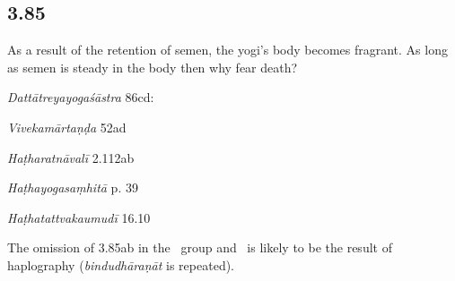 \begin{ekdosis}
\subsection*{3.85}
\begin{translation}[hp03_085]
As a result of the retention of semen, the yogi's body becomes fragrant. As long as semen is steady in the body then why fear death?%
\end{translation}

\begin{sources}[hp03_085]
\emph{Dattātreyayogaśāstra} 86cd:
\begin{versinnote}
\end{versinnote}

\emph{Vivekamārtaṇḍa} 52ad
\begin{versinnote}
\end{versinnote}
\end{sources}

\begin{testimonia}[hp03_085]
\emph{Haṭharatnāvalī} 2.112ab
\begin{versinnote}
\end{versinnote}

\emph{Haṭhayogasaṃhitā} p. 39
\begin{versinnote}
\end{versinnote}

\emph{Haṭhatattvakaumudī} 16.10
\begin{versinnote}
\end{versinnote}
\end{testimonia}

\begin{philcomm}[hp03_085]
The omission of 3.85ab in the \texteta\ group and \deltaThree\ is likely to be the result of haplography (\emph{bindudhāraṇāt} is repeated).


\end{philcomm}
\end{ekdosis}
